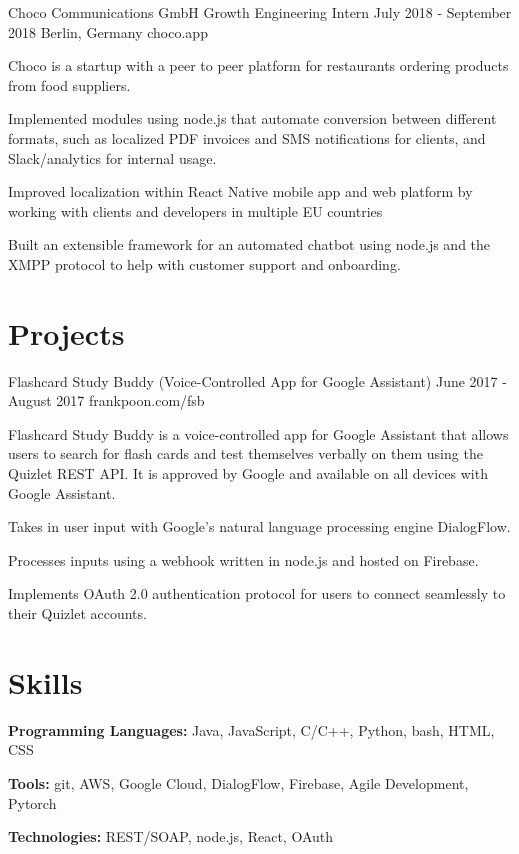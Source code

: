 \documentclass{resume}
\begin{document}
\job
{Choco Communications GmbH}
{Growth Engineering Intern}
{July 2018 - September 2018}
{Berlin, Germany}
{choco.app}
{
  Choco is a startup with a peer to peer platform for restaurants ordering 
  products from food suppliers.
  \begin{overview}
    \item Implemented modules using node.js that automate conversion between 
          different formats, such as localized PDF invoices and SMS 
          notifications for clients, and Slack/analytics for internal usage.
    \item Improved localization within React Native mobile app and web platform
          by working with clients and developers in multiple EU countries
    \item Built an extensible framework for an automated chatbot using node.js 
          and the XMPP protocol to help with customer support and onboarding.
  \end{overview}
}

\section{Projects}

\project
{Flashcard Study Buddy (Voice-Controlled App for Google Assistant)}
{June 2017 - August 2017}
{frankpoon.com/fsb}
{
  Flashcard Study Buddy is a voice-controlled app for Google Assistant that 
  allows users to search for flash cards and test themselves verbally on them 
  using the Quizlet REST API. It is approved by Google and available on all 
  devices with Google Assistant.
  \begin{overview}
    \item Takes in user input with Google's natural language processing engine 
          DialogFlow.
    \item Processes inputs using a webhook written in node.js and hosted on 
          Firebase.
    \item Implements OAuth 2.0 authentication protocol for users to connect 
          seamlessly to their Quizlet accounts.
  \end{overview}
}

\section{Skills}
\textbf{Programming Languages:} Java, JavaScript, C/C++, Python, bash, HTML, CSS

\textbf{Tools:} git, AWS, Google Cloud, DialogFlow, Firebase, Agile Development,
                Pytorch

\textbf{Technologies:} REST/SOAP, node.js, React, OAuth
\end{document}

